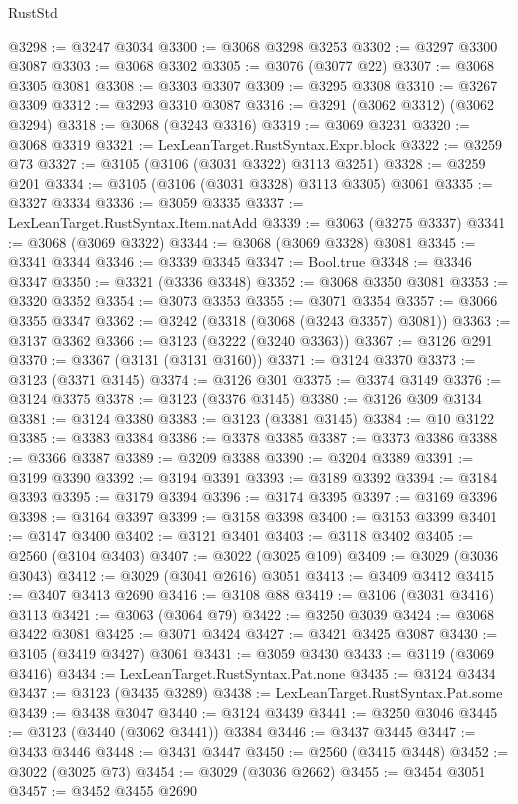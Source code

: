 \begin{lexlean}{RustStd}
\begin{coremodule}
@3298 := @3247 @3034
@3300 := @3068 @3298 @3253
@3302 := @3297 @3300 @3087
@3303 := @3068 @3302
@3305 := @3076 (@3077 @22)
@3307 := @3068 @3305 @3081
@3308 := @3303 @3307
@3309 := @3295 @3308
@3310 := @3267 @3309
@3312 := @3293 @3310 @3087
@3316 := @3291 (@3062 @3312) (@3062 @3294)
@3318 := @3068 (@3243 @3316)
@3319 := @3069 @3231
@3320 := @3068 @3319
@3321 := LexLeanTarget.RustSyntax.Expr.block
@3322 := @3259 @73
@3327 := @3105 (@3106 (@3031 @3322) @3113 @3251)
@3328 := @3259 @201
@3334 := @3105 (@3106 (@3031 @3328) @3113 @3305) @3061
@3335 := @3327 @3334
@3336 := @3059 @3335
@3337 := LexLeanTarget.RustSyntax.Item.natAdd
@3339 := @3063 (@3275 @3337)
@3341 := @3068 (@3069 @3322)
@3344 := @3068 (@3069 @3328) @3081
@3345 := @3341 @3344
@3346 := @3339 @3345
@3347 := Bool.true
@3348 := @3346 @3347
@3350 := @3321 (@3336 @3348)
@3352 := @3068 @3350 @3081
@3353 := @3320 @3352
@3354 := @3073 @3353
@3355 := @3071 @3354
@3357 := @3066 @3355 @3347
@3362 := @3242 (@3318 (@3068 (@3243 @3357) @3081))
@3363 := @3137 @3362
@3366 := @3123 (@3222 (@3240 @3363))
@3367 := @3126 @291
@3370 := @3367 (@3131 (@3131 @3160))
@3371 := @3124 @3370
@3373 := @3123 (@3371 @3145)
@3374 := @3126 @301
@3375 := @3374 @3149
@3376 := @3124 @3375
@3378 := @3123 (@3376 @3145)
@3380 := @3126 @309 @3134
@3381 := @3124 @3380
@3383 := @3123 (@3381 @3145)
@3384 := @10 @3122
@3385 := @3383 @3384
@3386 := @3378 @3385
@3387 := @3373 @3386
@3388 := @3366 @3387
@3389 := @3209 @3388
@3390 := @3204 @3389
@3391 := @3199 @3390
@3392 := @3194 @3391
@3393 := @3189 @3392
@3394 := @3184 @3393
@3395 := @3179 @3394
@3396 := @3174 @3395
@3397 := @3169 @3396
@3398 := @3164 @3397
@3399 := @3158 @3398
@3400 := @3153 @3399
@3401 := @3147 @3400
@3402 := @3121 @3401
@3403 := @3118 @3402
@3405 := @2560 (@3104 @3403)
@3407 := @3022 (@3025 @109)
@3409 := @3029 (@3036 @3043)
@3412 := @3029 (@3041 @2616) @3051
@3413 := @3409 @3412
@3415 := @3407 @3413 @2690
@3416 := @3108 @88
@3419 := @3106 (@3031 @3416) @3113
@3421 := @3063 (@3064 @79)
@3422 := @3250 @3039
@3424 := @3068 @3422 @3081
@3425 := @3071 @3424
@3427 := @3421 @3425 @3087
@3430 := @3105 (@3419 @3427) @3061
@3431 := @3059 @3430
@3433 := @3119 (@3069 @3416)
@3434 := LexLeanTarget.RustSyntax.Pat.none
@3435 := @3124 @3434
@3437 := @3123 (@3435 @3289)
@3438 := LexLeanTarget.RustSyntax.Pat.some
@3439 := @3438 @3047
@3440 := @3124 @3439
@3441 := @3250 @3046
@3445 := @3123 (@3440 (@3062 @3441)) @3384
@3446 := @3437 @3445
@3447 := @3433 @3446
@3448 := @3431 @3447
@3450 := @2560 (@3415 @3448)
@3452 := @3022 (@3025 @73)
@3454 := @3029 (@3036 @2662)
@3455 := @3454 @3051
@3457 := @3452 @3455 @2690

\end{coremodule}
\end{lexlean}
